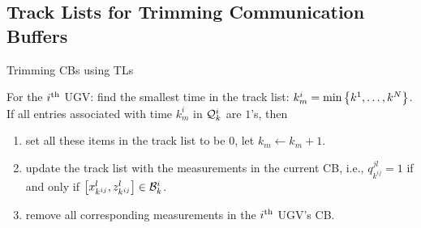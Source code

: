 	
	
	\subsection{Track Lists for Trimming Communication Buffers}\label{subsec:tracklist}
	\begin{algorithm}
		\caption{Trimming CBs using TLs}
		\label{alg:tracklist}
		\begin{algorithmic}
			\State 
			For the $i^\text{th}$ UGV:			
			find the smallest time in the track list: $k^i_m=\min\left\lbrace k^{1},\dots,k^{N} \right\rbrace$. 			
			If all entries associated with time $k^i_m$ in $\mathcal{Q}^i_k$ are $1$'s, then 
			\begin{enumerate}
				\item set all these items in the track list to be $0$, let $k_m \leftarrow k_m+1.$
				\item update the track list with the measurements in the current CB, i.e., $q^{jl}_{k^{ij}}=1$ if and only if $\left[x^l_{k^{ij}},z^l_{k^{ij}}\right]\in \mathcal{B}^i_k$.
				\item remove all corresponding measurements in the $i^\text{th}$ UGV's CB.
			\end{enumerate}				
		\end{algorithmic}
	\end{algorithm}
	
